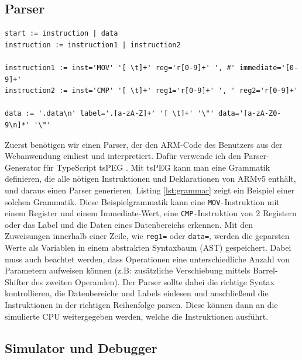 \documentclass[a4paper, 11pt, onecolumn]{article}
\begin{document}
\subsection{Parser}

\begin{lstlisting}[caption={Beispielgrammatik mit tsPEG für 2 verschiedene Instruktionen und Daten eines Speicherbereichs mit Label.},label={lst:grammar}]
start := instruction | data
instruction := instruction1 | instruction2

instruction1 := inst='MOV' '[ \t]+' reg='r[0-9]+' ', #' immediate='[0-9]+'
instruction2 := inst='CMP' '[ \t]+' reg1='r[0-9]+' ', ' reg2='r[0-9]+'

data := '.data\n' label='.[a-zA-Z]+' '[ \t]+' '\"' data='[a-zA-Z0-9\n]*' '\"'
\end{lstlisting}

Zuerst benötigen wir einen Parser, der den ARM-Code des Benutzers aus der Webanwendung einliest und interpretiert. Dafür verwende ich den Parser-Generator für TypeScript tsPEG \cite{tspeg}. Mit tsPEG kann man eine Grammatik definieren, die alle nötigen Instruktionen und Deklarationen von ARMv5 enthält, und daraus einen Parser generieren. Listing \ref{lst:grammar} zeigt ein Beispiel einer solchen Grammatik. Diese Beispielgrammatik kann eine \texttt{MOV-}Instruktion mit einem Register und einem Immediate-Wert, eine \texttt{CMP-}Instruktion von 2 Registern oder das Label und die Daten eines Datenbereichs erkennen. Mit den Zuweisungen innerhalb einer Zeile, wie \texttt{reg1=} oder \texttt{data=}, werden die geparsten Werte als Variablen in einem abstrakten Syntaxbaum (AST) gespeichert. Dabei muss auch beachtet werden, dass Operationen eine unterschiedliche Anzahl von Parametern aufweisen können (z.B: zusätzliche Verschiebung mittels Barrel-Shifter des zweiten Operanden). Der Parser sollte dabei die richtige Syntax kontrollieren, die Datenbereiche und Labels einlesen und anschließend die Instruktionen in der richtigen Reihenfolge parsen. Diese können dann an die simulierte CPU weitergegeben werden, welche die Instruktionen ausführt.

\subsection{Simulator und Debugger}\label{sec:debug}
\end{document}
